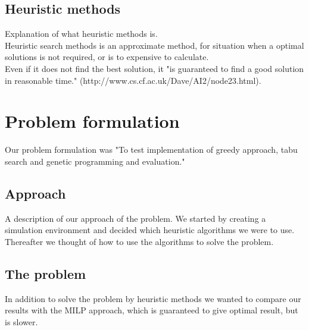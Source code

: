 \subsection{Heuristic methods}
Explanation of what heuristic methods is.\\
Heuristic search methods is an approximate method, for situation when a optimal solutions is not required, or is to expensive to calculate. \\Even if it does not find the best solution, it "is guaranteed to find a good solution in reasonable time." (http://www.cs.cf.ac.uk/Dave/AI2/node23.html).

\section{Problem formulation}
Our problem formulation was "To test implementation of greedy approach, tabu search and genetic programming and evaluation."


\subsection{Approach}
A description of our approach of the problem. We started by creating a simulation environment and decided which heuristic algorithms we were to use. Thereafter we thought of how to use the algorithms to solve the problem.

\subsection{The problem}
In addition to solve the problem by heuristic methods we wanted to compare our results with the MILP approach, which is guaranteed to give optimal result, but is slower.